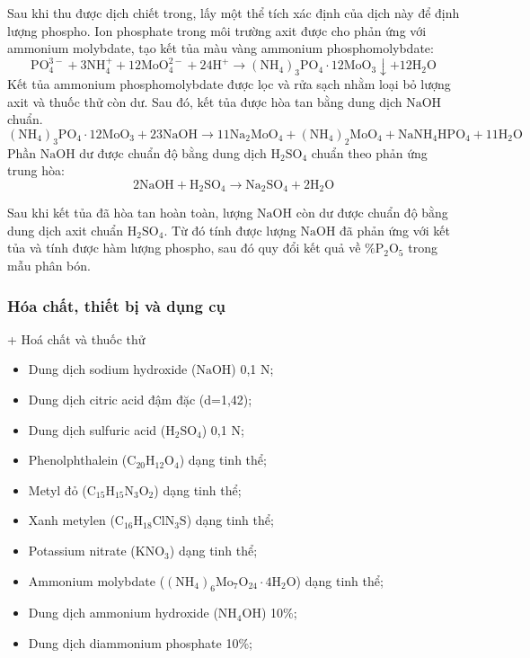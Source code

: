 Sau khi thu được dịch chiết trong, lấy một thể tích xác định của dịch này để định lượng phospho. 
Ion phosphate trong môi trường axit được cho phản ứng với ammonium molybdate, tạo kết tủa màu vàng ammonium phosphomolybdate:
\[
  \mathrm{PO_4^{3-} + 3NH_4^+ + 12MoO_4^{2-} + 24H^+
  \longrightarrow (NH_4)_3PO_4 \cdot 12MoO_3 \downarrow + 12H_2O}
\]
Kết tủa ammonium phosphomolybdate được lọc và rửa sạch nhằm loại bỏ lượng axit và thuốc thử còn dư. Sau đó, kết tủa được hòa tan bằng dung dịch \(\mathrm{NaOH}\) chuẩn.
\[
  \mathrm{(NH_4)_3PO_4 \cdot 12MoO_3 + 23NaOH
  \longrightarrow 11Na_2MoO_4 + (NH_4)_2MoO_4 + NaNH_4HPO_4 + 11H_2O}
\]
Phần \(\mathrm{NaOH}\) dư được chuẩn độ bằng dung dịch \(\mathrm{H_2SO_4}\) chuẩn theo phản ứng trung hòa:
\[
  \mathrm{2NaOH + H_2SO_4 \longrightarrow Na_2SO_4 + 2H_2O}
\]

Sau khi kết tủa đã hòa tan hoàn toàn, lượng \(\mathrm{NaOH}\) còn dư được chuẩn độ bằng dung dịch axit chuẩn \(\mathrm{H_2SO_4}\).
Từ đó tính được lượng \(\mathrm{NaOH}\) đã phản ứng với kết tủa và tính được hàm lượng phospho, sau đó quy đổi kết quả về \(\%\mathrm{P_2O_5}\) trong mẫu phân bón.

\subsubsection{Hóa chất, thiết bị và dụng cụ}
+ Hoá chất và thuốc thử
\begin{itemize}
  \item Dung dịch sodium hydroxide (\(\mathrm{NaOH}\)) 0,1 N;
  \item Dung dịch citric acid đậm đặc (d=1,42);
  \item Dung dịch sulfuric acid (\(\mathrm{H_2SO_4}\)) 0,1 N;
  \item Phenolphthalein (\(\mathrm{C_{20}H_{12}O_4}\)) dạng tinh thể;
  \item Metyl đỏ (\(\mathrm{C_{15}H_{15}N_3O_2}\)) dạng tinh thể;
  \item Xanh metylen (\(\mathrm{C_{16}H_{18}ClN_3S}\)) dạng tinh thể;
  \item Potassium nitrate (\(\mathrm{KNO_3}\)) dạng tinh thể;
  \item Ammonium molybdate (\(\mathrm{(NH_4)_6Mo_7O_{24}\cdot 4H_2O}\)) dạng tinh thể;
  \item Dung dịch ammonium hydroxide (\(\mathrm{NH_4OH}\)) 10\%;
  \item Dung dịch diammonium phosphate 10\%;
\end{itemize}


